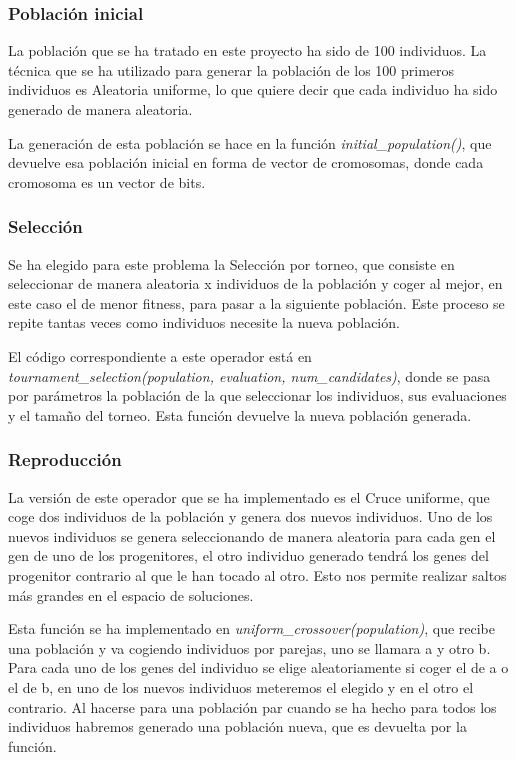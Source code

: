 \documentclass[12pt, spanish, pdftex]{UC3M_document}
\begin{document}
\subsubsection{Población inicial}
La población que se ha tratado en este proyecto ha sido de 100 individuos. La técnica que se ha utilizado para generar la población de los 100 primeros individuos es Aleatoria uniforme, lo que quiere decir que cada individuo ha sido generado de manera aleatoria. 

La generación de esta población se hace en la función \textit{initial\_population()}, que devuelve esa población inicial en forma de vector de cromosomas, donde cada cromosoma es un vector de bits.

\subsubsection{Selección}
Se ha elegido para este problema la Selección por torneo, que consiste en seleccionar de manera aleatoria x individuos de la población y coger al mejor, en este caso el de menor fitness, para pasar a la siguiente población. Este proceso se repite tantas veces como individuos necesite la nueva población.

El código correspondiente a este operador está en \textit{tournament\_selection(population, evaluation, num\_candidates)}, donde se pasa por parámetros la población de la que seleccionar los individuos, sus evaluaciones y el tamaño del torneo. Esta función devuelve la nueva población generada.

\subsubsection{Reproducción}
La versión de este operador que se ha implementado es el Cruce uniforme, que coge dos individuos de la población y genera dos nuevos individuos. Uno de los nuevos individuos se genera seleccionando de manera aleatoria para cada gen el gen de uno de los progenitores, el otro individuo generado tendrá los genes del progenitor contrario al que le han tocado al otro. Esto nos permite realizar saltos más grandes en el espacio de soluciones.

Esta función se ha implementado en \textit{uniform\_crossover(population)}, que recibe una población y va cogiendo individuos por parejas, uno se llamara a y otro b. Para cada uno de los genes del individuo se elige aleatoriamente si coger el de a o el de b, en uno de los nuevos individuos meteremos el elegido y en el otro el contrario. Al hacerse para una población par cuando se ha hecho para todos los individuos habremos generado una población nueva, que es devuelta por la función.
\end{document}
